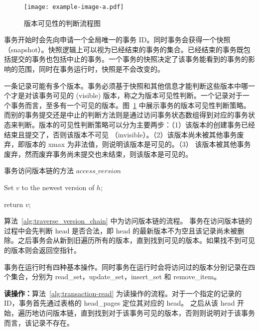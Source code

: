 \begin{figure}[ht]
    \centering
    \texttt{[image: example-image-a.pdf]}
    \caption{版本可见性的判断流程图}
    \label{fig:version-visibility}
\end{figure}

事务开始时会先向申请一个全局唯一的事务 ID。同时事务会获得一个快照 （snapshot）。快照逻辑上可以视为已经结束的事务的集合。已经结束的事务既包括提交的事务也包括中止的事务。一个事务的快照决定了该事务能看到的事务的影响的范围，同时在事务运行时，快照是不会改变的。

一条记录可能有多个版本。事务必须基于快照和其他信息才能判断这些版本中哪一个才是对该事务可见的 (visible) 版本，称之为版本可见性判断。一个记录对于一个事务而言，至多有一个可见的版本。图~\ref{fig:version-visibility} 中展示事务的版本可见性判断策略。而别的事务提交还是中止的判断方法则是通过访问事务状态数组得到对应的事务状态来判断。版本的可见性判断策略可以分为主要两步：（1）该版本的创建事务已经结束且提交了，否则该版本不可见 （invisible）。（2）该版本尚未被其他事务废弃，即版本的 xmax 为非法值，则说明该版本是可见的。（3） 该版本被其他事务废弃，然而废弃事务尚未提交也未结束，则该版本是可见的。

\begin{algorithm}[ht]
    \caption{事务访问版本链的方法 $access\_version$}
    \label{alg:traverse_version_chain}
    \BlankLine

    Set $v$ to the newest version of $h$;


    return $v$;

\end{algorithm}

算法~\ref{alg:traverse_version_chain} 中为访问版本链的流程。
事务在访问版本链的过程中会先判断 head 是否合法，即 head 的最新版本不为空且该记录尚未被删除。之后事务会从新到旧遍历所有的版本，直到找到可见的版本。如果找不到可见的版本则会返回空指针。


事务在运行时有四种基本操作。同时事务在运行时会将访问过的版本分别记录在四个集合，分别为 read\_set，update\_set，insert\_set 和 remove\_item。

\textbf{读操作：}算法~\ref{alg:transaction-read} 为读操作的流程。对于一个指定的记录的 ID，事务首先通过表格的 head\_pages 定位其对应的 head。
之后从该 head 开始，遍历地访问版本链，直到找到对于该事务可见的版本，否则则说明对于该事务而言，该记录不存在。

